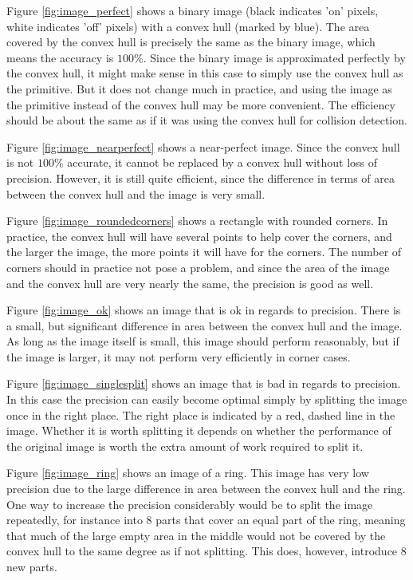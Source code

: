 Figure \ref{fig:image_perfect} shows a binary image
(black indicates 'on' pixels, white indicates 'off'
pixels) with a convex hull (marked by blue).
The area covered by the convex hull is precisely the
same as the binary image, which means the accuracy
is $100\%$. Since the binary image is approximated perfectly
by the convex hull, it might make sense in this case
to simply use the convex hull as the primitive.
But it does not change much in practice,
and using the image as the primitive instead
of the convex hull may be more convenient.
The efficiency should be about the same as
if it was using the convex hull for collision detection.

Figure \ref{fig:image_nearperfect} shows a near-perfect image.
Since the convex hull is not $100\%$ accurate, it cannot be replaced
by a convex hull without loss of precision. However, it is still quite
efficient, since the difference in terms of area between the convex hull
and the image is very small.

Figure \ref{fig:image_roundedcorners} shows a rectangle with rounded corners.
In practice, the convex hull will have several points to help cover the corners,
and the larger the image, the more points it will have for the corners.
The number of corners should in practice not pose a problem,
and since the area of the image and the convex hull are very nearly the same,
the precision is good as well.

Figure \ref{fig:image_ok} shows an image that is ok in regards to precision.
There is a small, but significant difference in area between the convex hull
and the image. As long as the image itself is small, this image should perform
reasonably, but if the image is larger, it may not perform very efficiently
in corner cases.

Figure \ref{fig:image_singlesplit} shows an image that is bad in regards
to precision. In this case the precision can easily
become optimal simply by splitting the image once in the right place.
The right place is indicated by a red, dashed line in the image.
Whether it is worth splitting it depends on whether the performance
of the original image is worth the extra amount of work required
to split it.

Figure \ref{fig:image_ring} shows an image of a ring.
This image has very low precision due to the large difference in area
between the convex hull and the ring.
One way to increase the precision considerably would be to split the image repeatedly,
for instance into 8 parts that cover an equal part of the ring,
meaning that much of the large empty area in the middle would not be covered
by the convex hull to the same degree as if not splitting.
This does, however, introduce 8 new parts.


